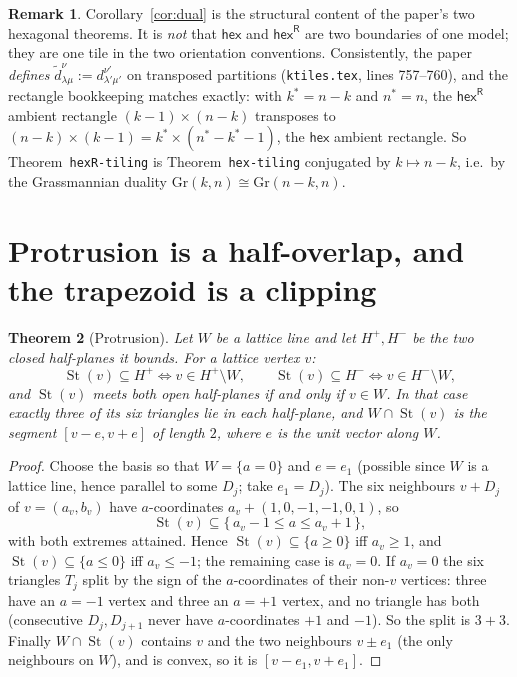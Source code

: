 \documentclass[11pt]{article}
\newtheorem{theorem}{Theorem}
\theoremstyle{definition}
\newtheorem{remark}[theorem]{Remark}
\newcommand{\hex}{\mathsf{hex}}
\newcommand{\hexR}{\mathsf{hex}^{\mathsf{R}}}
\newcommand{\la}{\lambda}
\newcommand{\Star}{\operatorname{St}}
\begin{document}
\begin{remark}
Corollary~\ref{cor:dual} is the structural content of the paper's two hexagonal
theorems. It is \emph{not} that $\hex$ and $\hexR$ are two boundaries of one
model; they are one tile in the two orientation conventions. Consistently, the
paper \emph{defines} $\tilde d^\nu_{\la\mu} := d^{\nu'}_{\la'\mu'}$ on transposed
partitions (\texttt{ktiles.tex}, lines 757--760), and the rectangle bookkeeping
matches exactly: with $k^\ast=n-k$ and $n^\ast=n$, the $\hexR$ ambient rectangle
$(k-1)\times(n-k)$ transposes to $(n-k)\times(k-1) =
k^\ast\times(n^\ast-k^\ast-1)$, the $\hex$ ambient rectangle. So
Theorem~\texttt{hexR-tiling} is Theorem~\texttt{hex-tiling} conjugated by
$k\mapsto n-k$, i.e.\ by the Grassmannian duality
$\mathrm{Gr}(k,n)\cong\mathrm{Gr}(n-k,n)$.
\end{remark}

\section{Protrusion is a half-overlap, and the trapezoid is a clipping}

\begin{theorem}[Protrusion]\label{thm:protrude}
Let $W$ be a lattice line and let $H^{+},H^{-}$ be the two closed half-planes it
bounds. For a lattice vertex $v$:
\[
 \Star(v)\subseteq H^{+} \iff v\in H^{+}\setminus W, \qquad
 \Star(v)\subseteq H^{-} \iff v\in H^{-}\setminus W,
\]
and $\Star(v)$ meets both open half-planes if and only if $v\in W$. In that
case exactly three of its six triangles lie in each half-plane, and
$W\cap\Star(v)$ is the segment $[v-e,v+e]$ of length $2$, where $e$ is the unit
vector along $W$.
\end{theorem}

\begin{proof}
Choose the basis so that $W=\{a=0\}$ and $e=e_1$ (possible since $W$ is a
lattice line, hence parallel to some $D_j$; take $e_1=D_j$). The six neighbours
$v+D_j$ of $v=(a_v,b_v)$ have $a$-coordinates $a_v+(1,0,-1,-1,0,1)$, so
\[
 \Star(v)\subseteq\{\,a_v-1\le a\le a_v+1\,\},
\]
with both extremes attained. Hence $\Star(v)\subseteq\{a\ge0\}$ iff $a_v\ge1$,
and $\Star(v)\subseteq\{a\le0\}$ iff $a_v\le-1$; the remaining case is $a_v=0$.
If $a_v=0$ the six triangles $T_j$ split by the sign of the $a$-coordinates of
their non-$v$ vertices: three have an $a=-1$ vertex and three an $a=+1$ vertex,
and no triangle has both (consecutive $D_j,D_{j+1}$ never have $a$-coordinates
$+1$ and $-1$). So the split is $3+3$. Finally $W\cap\Star(v)$ contains $v$ and
the two neighbours $v\pm e_1$ (the only neighbours on $W$), and is convex, so it
is $[v-e_1,v+e_1]$.
\end{proof}
\end{document}
